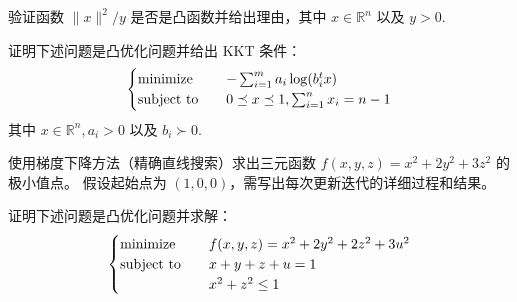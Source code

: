 \begin{problem}[问答]
    验证函数 $\|x\|^2 / y$ 是否是凸函数并给出理由，其中 $x \in \mathbb{R}^n$ 以及 $y > 0$.
    \Answer 
\end{problem}

\begin{problem}[问答]
    证明下述问题是凸优化问题并给出 KKT 条件：\[\begin{cases}
        \operatorname{minimize} \quad &-\sum_{i = 1}^m a_i\log(b_i^tx)\\
        \operatorname{subject\ to} \quad &0 \preceq x \preceq 1, \sum_{i = 1}^nx_i = n - 1
    \end{cases}\] 其中 $x\in \mathbb{R}^n, a_i > 0$ 以及 $b_i \succ 0$.
    \Answer 
\end{problem}

\begin{problem}[问答]
    使用梯度下降方法（精确直线搜索）求出三元函数 $f(x, y, z) = x^2 + 2y^2 + 3z^2$ 的极小值点。 假设起始点为 $(1, 0, 0)$，需写出每次更新迭代的详细过程和结果。
    \Answer 
\end{problem}

\begin{problem}[问答]
    证明下述问题是凸优化问题并求解：\[\begin{cases}
        \operatorname{minimize} \quad &f(x, y, z) = x^2 + 2y^2 + 2z^2 + 3u^2\\
        \operatorname{subject\ to} \quad &x + y + z + u = 1\\
        &x^2 + z^2 \le 1 
    \end{cases}\]
    \Answer 
\end{problem}

